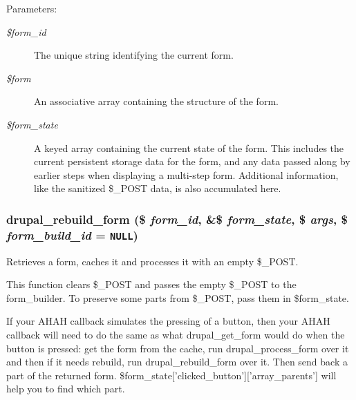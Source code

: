 \begin{Desc}
\item[Parameters:]
\begin{description}
\item[{\em \$form\_\-id}]The unique string identifying the current form. \item[{\em \$form}]An associative array containing the structure of the form. \item[{\em \$form\_\-state}]A keyed array containing the current state of the form. This includes the current persistent storage data for the form, and any data passed along by earlier steps when displaying a multi-step form. Additional information, like the sanitized \$\_\-POST data, is also accumulated here. \end{description}
\end{Desc}
\hypertarget{group__form__api_g31c0f01e4157f02cc01a0c5d12d60b09}{
\subsubsection[{drupal\_\-rebuild\_\-form}]{\setlength{\rightskip}{0pt plus 5cm}drupal\_\-rebuild\_\-form (\$ {\em form\_\-id}, \/  \&\$ {\em form\_\-state}, \/  \$ {\em args}, \/  \$ {\em form\_\-build\_\-id} = {\tt NULL})}}
\label{group__form__api_g31c0f01e4157f02cc01a0c5d12d60b09}


Retrieves a form, caches it and processes it with an empty \$\_\-POST.

This function clears \$\_\-POST and passes the empty \$\_\-POST to the form\_\-builder. To preserve some parts from \$\_\-POST, pass them in \$form\_\-state.

If your AHAH callback simulates the pressing of a button, then your AHAH callback will need to do the same as what drupal\_\-get\_\-form would do when the button is pressed: get the form from the cache, run drupal\_\-process\_\-form over it and then if it needs rebuild, run drupal\_\-rebuild\_\-form over it. Then send back a part of the returned form. \$form\_\-state\mbox{[}'clicked\_\-button'\mbox{]}\mbox{[}'array\_\-parents'\mbox{]} will help you to find which part.

